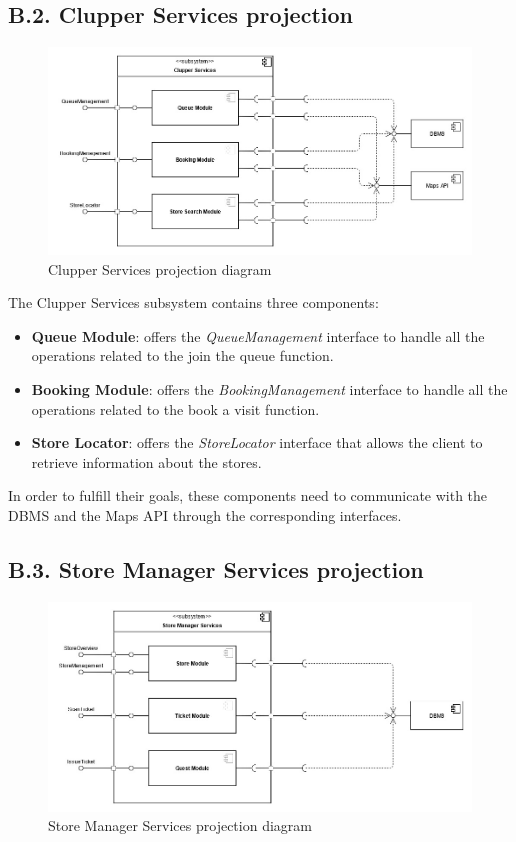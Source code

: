 \subsection{B.2. Clupper Services projection}

\begin{figure}[H]
\centering
\includegraphics{assets/dd/components_view/clupper_services_projection}
\caption{Clupper Services projection diagram}
\end{figure}

The Clupper Services subsystem contains three components:
\begin{itemize}
\item
    \textbf{Queue Module}: offers the \emph{QueueManagement} interface to handle all the operations related to the join the queue function.
\item
    \textbf{Booking Module}: offers the \emph{BookingManagement} interface to handle all the operations related to the book a visit function.
\item
    \textbf{Store Locator}: offers the \emph{StoreLocator} interface that allows the client to retrieve information about the stores.
\end{itemize}
In order to fulfill their goals, these components need to communicate with the DBMS and the Maps API through the corresponding interfaces.

\subsection{B.3. Store Manager Services projection}

\begin{figure}[H]
\centering
\includegraphics{assets/dd/components_view/store_manager_services_projection}
\caption{Store Manager Services projection diagram}
\end{figure}

